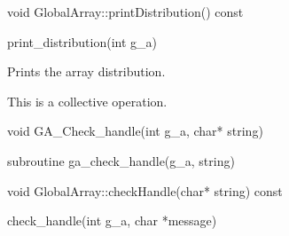 \documentclass[12pt]{article}
\begin{document}
\begin{cxxapi}
\begin{cxxcode}
void GlobalArray::printDistribution() const
\end{cxxcode}
\end{cxxapi}

\begin{pyapi}
\begin{pycode}
print_distribution(int g_a) 
\end{pycode}
\end{pyapi} 


\begin{desc}

Prints the array distribution.

This is a collective operation.
\end{desc}


\begin{capi}
\begin{ccode}
void GA_Check_handle(int g_a, char* string)
\end{ccode}
\begin{funcargs}
\end{funcargs}
\end{capi}

\begin{fapi}
\begin{fcode}
subroutine ga_check_handle(g_a, string)
\end{fcode}
\begin{funcargs}
\end{funcargs}
\end{fapi}

\begin{cxxapi}
\begin{cxxcode}
void GlobalArray::checkHandle(char* string) const
\end{cxxcode}
\begin{funcargs}
\end{funcargs}
\end{cxxapi}

\begin{pyapi}
\begin{pycode}
check_handle(int g_a, char *message)
\end{pycode}
\end{pyapi}
\end{document}
